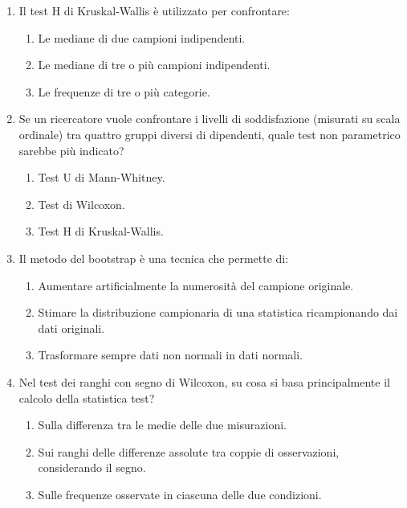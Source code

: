 \documentclass[12pt, a4paper]{article}
\begin{document}
\begin{enumerate}
    \item Il test H di Kruskal-Wallis è utilizzato per confrontare:
    \begin{enumerate}
        \item Le mediane di due campioni indipendenti.
        \item Le mediane di tre o più campioni indipendenti.
        \item Le frequenze di tre o più categorie.
    \end{enumerate}
    \vspace{0.5cm}

    \item Se un ricercatore vuole confrontare i livelli di soddisfazione (misurati su scala ordinale) tra quattro gruppi diversi di dipendenti, quale test non parametrico sarebbe più indicato?
    \begin{enumerate}
        \item Test U di Mann-Whitney.
        \item Test di Wilcoxon.
        \item Test H di Kruskal-Wallis.
    \end{enumerate}
    \vspace{0.5cm}

    \item Il metodo del bootstrap è una tecnica che permette di:
    \begin{enumerate}
        \item Aumentare artificialmente la numerosità del campione originale.
        \item Stimare la distribuzione campionaria di una statistica ricampionando dai dati originali.
        \item Trasformare sempre dati non normali in dati normali.
    \end{enumerate}
    \vspace{0.5cm}

    \item Nel test dei ranghi con segno di Wilcoxon, su cosa si basa principalmente il calcolo della statistica test?
    \begin{enumerate}
        \item Sulla differenza tra le medie delle due misurazioni.
        \item Sui ranghi delle differenze assolute tra coppie di osservazioni, considerando il segno.
        \item Sulle frequenze osservate in ciascuna delle due condizioni.
    \end{enumerate}
    \vspace{0.5cm}


\end{enumerate}
\end{document}

